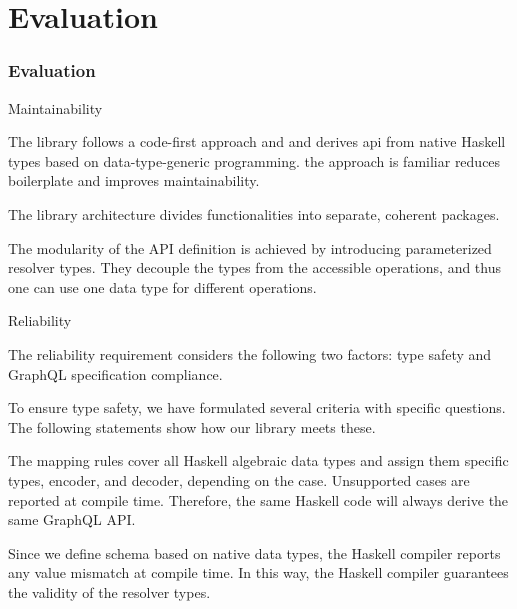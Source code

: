 \section{Evaluation}

\begin{frame}[allowframebreaks]\frametitle{Evaluation}

\begin{block}{Maintainability}

  \begin{itemize}
  
     The library follows a code-first approach and and derives api from native Haskell types based on data-type-generic programming. the approach is familiar reduces boilerplate and improves maintainability.

      The library architecture divides functionalities into separate, coherent packages. 
    
      The modularity of the API definition is achieved by introducing parameterized resolver types. They decouple the types from the accessible operations, and thus one can use one data type for different operations.

  \end{itemize}

\end{block}


\begin{block}{Reliability}

The reliability requirement considers the following two factors: type safety and GraphQL specification compliance.

\begin{itemize}

   To ensure type safety, we have formulated several criteria with specific questions. The following statements show how our library meets these.
    
    \begin{enumerate}

       The mapping rules cover all Haskell algebraic data types and assign them specific types, encoder, and decoder, depending on the case. Unsupported cases are reported at compile time. Therefore, the same Haskell code will always derive the same GraphQL API. 

       Since we define schema based on native data types, the Haskell compiler reports any value mismatch at compile time. In this way, the Haskell compiler guarantees the validity of the resolver types.
      

\end{enumerate}
\end{itemize}
\end{block}
\end{frame}
